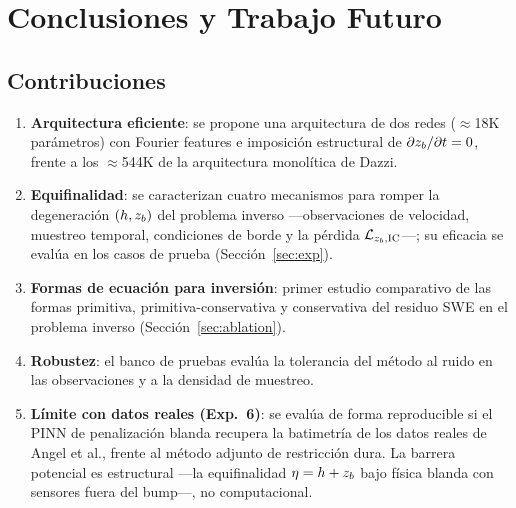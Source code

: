 \section{Conclusiones y Trabajo Futuro}
\label{sec:concl}

\subsection{Contribuciones}

\begin{enumerate}
  \item \textbf{Arquitectura eficiente}: se propone una arquitectura de dos
        redes ($\approx$18K parámetros) con Fourier features e imposición
        estructural de $\partial z_b/\partial t = 0$, frente a los
        $\approx$544K de la arquitectura monolítica de Dazzi.

  \item \textbf{Equifinalidad}: se caracterizan cuatro mecanismos para romper
        la degeneración $(h, z_b)$ del problema inverso ---observaciones de
        velocidad, muestreo temporal, condiciones de borde y la pérdida
        $\mathcal{L}_{z_b,\text{IC}}$---; su eficacia se evalúa en los casos
        de prueba (Sección~\ref{sec:exp}).

  \item \textbf{Formas de ecuación para inversión}: primer estudio comparativo
        de las formas primitiva, primitiva-conservativa y conservativa del
        residuo SWE en el problema inverso (Sección~\ref{sec:ablation}).

  \item \textbf{Robustez}: el banco de pruebas evalúa la tolerancia del método
        al ruido en las observaciones y a la densidad de muestreo.

  \item \textbf{Límite con datos reales (Exp.\ 6)}: se evalúa de forma
        reproducible si el PINN de penalización blanda recupera la batimetría
        de los datos reales de Angel et al., frente al método adjunto de
        restricción dura. La barrera potencial es estructural ---la
        equifinalidad $\eta = h + z_b$ bajo física blanda con sensores fuera
        del bump---, no computacional.
\end{enumerate}

